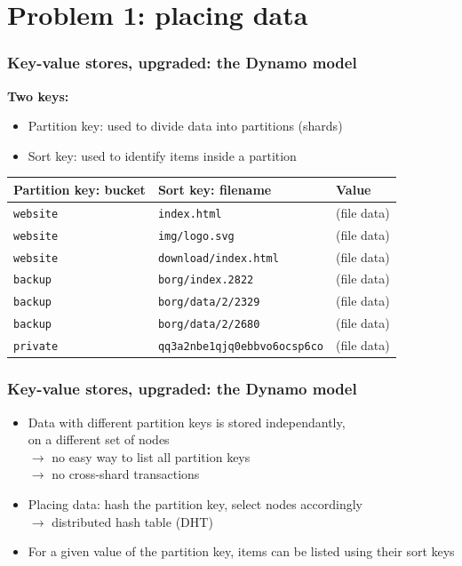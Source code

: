 \documentclass[aspectratio=169]{beamer}
\begin{document}
\section{Problem 1: placing data}

\begin{frame}
	\frametitle{Key-value stores, upgraded: the Dynamo model}
	\textbf{Two keys:}
	\begin{itemize}
		\item Partition key: used to divide data into partitions (shards)
		\item Sort key: used to identify items inside a partition
	\end{itemize}

	\vspace{1em}

	\begin{center}
	\begin{tabular}{|l|l|p{3cm}|}
		\hline
		\textbf{Partition key: bucket} & \textbf{Sort key: filename} & \textbf{Value} \\
		\hline
		\hline
		\texttt{website} & \texttt{index.html} & (file data) \\
		\hline
		\texttt{website} & \texttt{img/logo.svg} & (file data) \\
		\hline
		\texttt{website} & \texttt{download/index.html} & (file data) \\
		\hline
		\hline
		\texttt{backup} & \texttt{borg/index.2822} & (file data) \\
		\hline
		\texttt{backup} & \texttt{borg/data/2/2329} & (file data) \\
		\hline
		\texttt{backup} & \texttt{borg/data/2/2680} & (file data) \\
		\hline
		\hline
		\texttt{private} & \texttt{qq3a2nbe1qjq0ebbvo6ocsp6co} & (file data) \\
		\hline
	\end{tabular}
	\end{center}
\end{frame}

\begin{frame}
	\frametitle{Key-value stores, upgraded: the Dynamo model}
	\begin{itemize}
		\item Data with different partition keys is stored independantly,\\
			on a different set of nodes\\
			\vspace{.5em}
			$\to$ no easy way to list all partition keys\\
			$\to$ no cross-shard transactions\\
			\vspace{2em}
		\item Placing data: hash the partition key, select nodes accordingly\\
			\vspace{.5em}
			$\to$ distributed hash table (DHT)
			\vspace{2em}
		\item For a given value of the partition key, items can be listed using their sort keys
	\end{itemize}
\end{frame}
\end{document}
